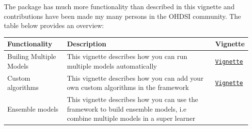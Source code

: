 \documentclass[
]{article}
\begin{document}
The package has much more functionality than described in this vignette
and contributions have been made my many persons in the OHDSI community.
The table below provides an overview:

\begin{longtable}[]{@{}lll@{}}
\toprule
\begin{minipage}[b]{0.18\columnwidth}\raggedright
Functionality\strut
\end{minipage} & \begin{minipage}[b]{0.55\columnwidth}\raggedright
Description\strut
\end{minipage} & \begin{minipage}[b]{0.18\columnwidth}\raggedright
Vignette\strut
\end{minipage}\tabularnewline
\midrule
\endhead
\begin{minipage}[t]{0.18\columnwidth}\raggedright
Builing Multiple Models\strut
\end{minipage} & \begin{minipage}[t]{0.55\columnwidth}\raggedright
This vignette describes how you can run multiple models
automatically\strut
\end{minipage} & \begin{minipage}[t]{0.18\columnwidth}\raggedright
\href{https://github.com/OHDSI/PatientLevelPrediction/blob/master/inst/doc/BuildingMultiplePredictiveModels.pdf}{\texttt{Vignette}}\strut
\end{minipage}\tabularnewline
\begin{minipage}[t]{0.18\columnwidth}\raggedright
Custom algorithms\strut
\end{minipage} & \begin{minipage}[t]{0.55\columnwidth}\raggedright
This vignette describes how you can add your own custom algorithms in
the framework\strut
\end{minipage} & \begin{minipage}[t]{0.18\columnwidth}\raggedright
\href{https://github.com/OHDSI/PatientLevelPrediction/blob/master/inst/doc/AddingCustomAlgorithms.pdf}{\texttt{Vignette}}\strut
\end{minipage}\tabularnewline
\begin{minipage}[t]{0.18\columnwidth}\raggedright
Ensemble models\strut
\end{minipage} & \begin{minipage}[t]{0.55\columnwidth}\raggedright
This vignette describes how you can use the framework to build ensemble
models, i.e combine multiple models in a super learner\strut

\end{minipage}
\end{longtable}
\end{document}
